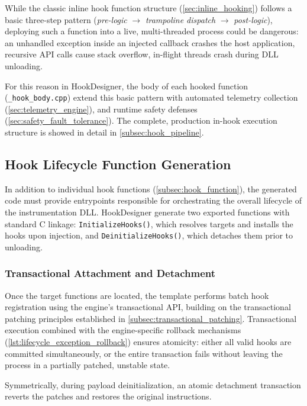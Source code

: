 While the classic inline hook function structure (\cref{sec:inline_hooking}) follows a basic three-step pattern (\emph{pre-logic} $\rightarrow$ \emph{trampoline dispatch} $\rightarrow$ \emph{post-logic}), deploying such a function into a live, multi-threaded process could be dangerous: an unhandled exception inside an injected callback crashes the host application, recursive API calls cause stack overflow, in-flight threads crash during DLL unloading.

For this reason in HookDesigner, the body of each hooked function (\texttt{\_hook\_body.cpp}) extend this basic pattern with automated telemetry collection (\cref{sec:telemetry_engine}), and runtime safety defenses (\cref{sec:safety_fault_tolerance}).
The complete, production in-hook execution structure is showed in detail in \cref{subsec:hook_pipeline}.


\subsection{Hook Lifecycle Function Generation}
\label{subsec:lifecycle_functions}

In addition to individual hook functions (\cref{subsec:hook_function}), the generated code must provide entrypoints responsible for orchestrating the overall lifecycle of the instrumentation DLL.
HookDesigner generate two exported functions with standard C linkage: \texttt{InitializeHooks()}, which resolves targets and installs the hooks upon injection, and \texttt{DeinitializeHooks()}, which detaches them prior to unloading.

\subsubsection{Transactional Attachment and Detachment}
\label{subsec:trans_attach_detach}

Once the target functions are located, the template performs batch hook registration using the engine's transactional API, building on the transactional patching principles established in \cref{subsec:transactional_patching}.
Transactional execution combined with the engine-specific rollback mechanisms (\cref{lst:lifecycle_exception_rollback}) ensures atomicity: either all valid hooks are committed simultaneously, or the entire transaction fails without leaving the process in a partially patched, unstable state.

Symmetrically, during payload deinitialization, an atomic detachment transaction reverts the patches and restores the original instructions.

